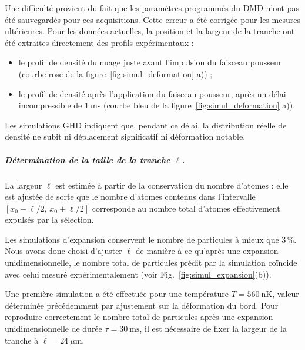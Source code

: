Une difficulté provient du fait que les paramètres programmés du \gls{DMD} n’ont pas été sauvegardés pour ces acquisitions. Cette erreur a été corrigée pour les mesures ultérieures. Pour les données actuelles, la position et la largeur de la tranche ont été extraites directement des profils expérimentaux :  

\begin{itemize}[label=$\bullet$]
    \item le profil de densité du nuage juste avant l’impulsion du faisceau pousseur (courbe rose de la figure~\ref{fig:simul_deformation} a)) ;
    \item le profil de densité après l’application du faisceau pousseur, après un délai incompressible de $1~\mathrm{ms}$ (courbe bleu de la figure~\ref{fig:simul_deformation} a)).
\end{itemize}

Les simulations \gls{GHD} indiquent que, pendant ce délai, la distribution réelle de densité ne subit ni déplacement significatif ni déformation notable. %

\subparagraph{Détermination de la taille de la tranche \(\ell\).}

La largeur \(\ell\) est estimée à partir de la conservation du nombre d’atomes : elle est ajustée de sorte que le nombre d’atomes contenus dans l’intervalle \([x_0-\ell/2,\,x_0+\ell/2]\) corresponde au nombre total d’atomes effectivement expulsés par la sélection.

\medskip

Les simulations d’expansion conservent le nombre de particules à mieux que \(3\,\%\). Nous avons donc choisi d’ajuster \(\ell\) de manière à ce qu’après une expansion unidimensionnelle, le nombre total de particules prédit par la simulation coïncide avec celui mesuré expérimentalement (voir Fig.~\ref{fig:simul_expansion}(b)).

\medskip

Une première simulation a été effectuée pour une température \(T = 560~\mathrm{nK}\), valeur déterminée précédemment par ajustement sur la déformation du bord.  
Pour reproduire correctement le nombre total de particules après une expansion unidimensionnelle de durée \(\tau = 30~\mathrm{ms}\), il est nécessaire de fixer la largeur de la tranche à \(\ell = 24~\mu\mathrm{m}\).
 





